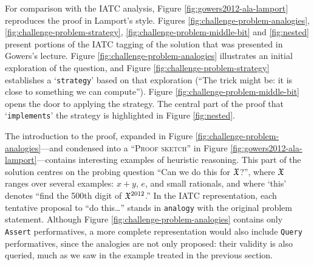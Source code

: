 \documentclass[smallextended,oneside]{svjour3}       %
\newcommand\nothing[1]{#1}
\let\paragraph\nothing
\begin{document}
\paragraph{For comparison with the IATC analysis, Figure \ref{fig:gowers2012-ala-lamport} reproduces the proof in Lamport's style. Figures \ref{fig:challenge-problem-analogies}, \ref{fig:challenge-problem-strategy}, \ref{fig:challenge-problem-middle-bit}
and \ref{fig:nested} present portions of the IATC tagging of the solution that was presented in Gowers's lecture.}
Figure \ref{fig:challenge-problem-analogies} illustrates an initial
exploration of the question, and Figure
\ref{fig:challenge-problem-strategy} establishes a `\texttt{strategy}'
based on that exploration (``The trick might be: it is close to
something we can compute'').
Figure \ref{fig:challenge-problem-middle-bit} opens the door to
applying the strategy.
The central part of the proof that `\texttt{implements}' the strategy
is highlighted in Figure \ref{fig:nested}.

\paragraph{The introduction to the proof, expanded in Figure \ref{fig:challenge-problem-analogies}---and condensed into a ``{\scshape Proof sketch}'' in Figure \ref{fig:gowers2012-ala-lamport}---contains interesting examples of heuristic reasoning.}
This part of the solution centres on the probing question ``Can we do
this for $\frak{X}$?'', where $\frak{X}$ ranges over several examples:
$x+y$, $e$, and small rationals, and where `this' denotes ``find the
500th digit of $\frak{X}^{2012}$.''  In the IATC representation, each
tentative proposal to ``do this\ldots'' stands in \texttt{analogy}
with the original problem statement.  Although Figure
\ref{fig:challenge-problem-analogies} contains only \texttt{Assert}
performatives, a more complete representation would also include
\texttt{Query} performatives, since the analogies are not only
proposed: their validity is also queried, much as we saw in the
example treated in the previous section.
\end{document}
